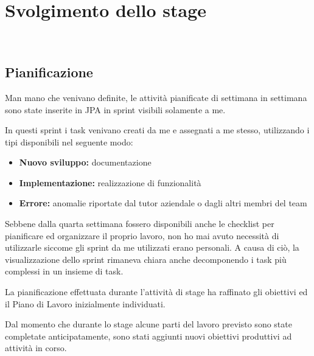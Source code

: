 
\chapter{Svolgimento dello stage}
\label{cap:progetto}

\\

\section{Pianificazione}\label{sec:prog-pianif}

Man mano che venivano definite, le attività pianificate di settimana in
settimana sono state inserite in JPA in sprint visibili solamente a me.

In questi sprint i task venivano creati da me e assegnati a me stesso,
utilizzando i tipi disponibili nel seguente modo:

\begin{itemize}
\item \textbf{Nuovo sviluppo:} documentazione
\item \textbf{Implementazione:} realizzazione di funzionalità
\item \textbf{Errore:} anomalie riportate dal tutor aziendale o dagli altri
  membri del team
\end{itemize}

Sebbene dalla quarta settimana fossero disponibili anche le checklist per
pianificare ed organizzare il proprio lavoro, non ho mai avuto necessità di
utilizzarle siccome gli sprint da me utilizzati erano personali. A causa
di ciò, la visualizzazione dello sprint rimaneva chiara anche decomponendo i
task più complessi in un insieme di task.

La pianificazione effettuata durante l'attività di stage ha raffinato gli
obiettivi ed il Piano di Lavoro inizialmente individuati.

Dal momento che durante lo stage alcune parti del lavoro previsto sono state
completate anticipatamente, sono stati aggiunti nuovi obiettivi produttivi ad
attività in corso.


